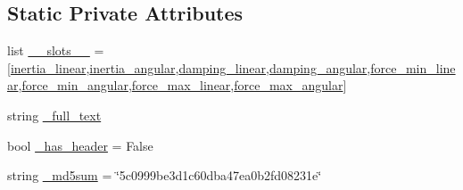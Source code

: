 \subsection*{Static Private Attributes}
\begin{DoxyCompactItemize}
\item 
list \hyperlink{classjaco__msgs_1_1srv_1_1__SetForceControlParams_1_1SetForceControlParamsRequest_ac3bb979295e82e22282860bf2dd4f733}{\+\_\+\+\_\+slots\+\_\+\+\_\+} = \mbox{[}\textquotesingle{}\hyperlink{classjaco__msgs_1_1srv_1_1__SetForceControlParams_1_1SetForceControlParamsRequest_ab5cf9f4019e6c446ca473ca2a38492ad}{inertia\+\_\+linear}\textquotesingle{},\textquotesingle{}\hyperlink{classjaco__msgs_1_1srv_1_1__SetForceControlParams_1_1SetForceControlParamsRequest_a4ffea018c8ffc3cf44cdd7d68c4ca918}{inertia\+\_\+angular}\textquotesingle{},\textquotesingle{}\hyperlink{classjaco__msgs_1_1srv_1_1__SetForceControlParams_1_1SetForceControlParamsRequest_a9ab3c9bb200986f210612fa05012ab2f}{damping\+\_\+linear}\textquotesingle{},\textquotesingle{}\hyperlink{classjaco__msgs_1_1srv_1_1__SetForceControlParams_1_1SetForceControlParamsRequest_aac62c737f326721243120ed57493f460}{damping\+\_\+angular}\textquotesingle{},\textquotesingle{}\hyperlink{classjaco__msgs_1_1srv_1_1__SetForceControlParams_1_1SetForceControlParamsRequest_a8cfd79fa02dd2f62d84811d5f04693b1}{force\+\_\+min\+\_\+linear}\textquotesingle{},\textquotesingle{}\hyperlink{classjaco__msgs_1_1srv_1_1__SetForceControlParams_1_1SetForceControlParamsRequest_a059ff47ab34fd7730218c1a609bbb956}{force\+\_\+min\+\_\+angular}\textquotesingle{},\textquotesingle{}\hyperlink{classjaco__msgs_1_1srv_1_1__SetForceControlParams_1_1SetForceControlParamsRequest_aae9888fc8efdf00c292dfaf866c90f7f}{force\+\_\+max\+\_\+linear}\textquotesingle{},\textquotesingle{}\hyperlink{classjaco__msgs_1_1srv_1_1__SetForceControlParams_1_1SetForceControlParamsRequest_a1e80687d03a465ee0a3b22923e11d7d1}{force\+\_\+max\+\_\+angular}\textquotesingle{}\mbox{]}
\item 
string \hyperlink{classjaco__msgs_1_1srv_1_1__SetForceControlParams_1_1SetForceControlParamsRequest_a4b52d22476ea2c3fdfa6a415227fccbe}{\+\_\+full\+\_\+text}
\item 
bool \hyperlink{classjaco__msgs_1_1srv_1_1__SetForceControlParams_1_1SetForceControlParamsRequest_a18b50f9b933c8f19cde6b87a2654a2c8}{\+\_\+has\+\_\+header} = False
\item 
string \hyperlink{classjaco__msgs_1_1srv_1_1__SetForceControlParams_1_1SetForceControlParamsRequest_a2bf3016222dee054e3b78d39be1e3644}{\+\_\+md5sum} = \char`\"{}5c0999be3d1c60dba47ea0b2fd08231e\char`\"{}

\end{DoxyCompactItemize}

